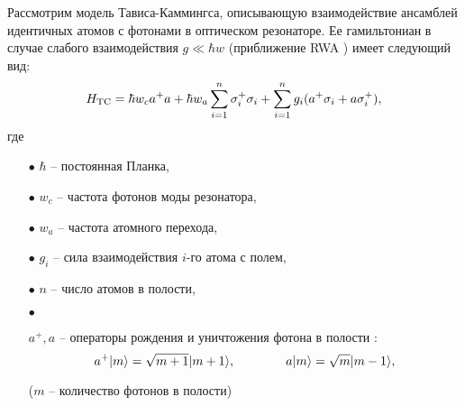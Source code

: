 Рассмотрим модель Тависа-Каммингса, описывающую взаимодействие ансамблей идентичных атомов с фотонами в оптическом резонаторе. Ее гамильтониан в случае слабого
взаимодействия $g \ll \hbar w$ (приближение RWA \cite{ozhigov_qq}) имеет следующий вид:
\begin{equation}
H_{\text{TC}} = \hbar w_{c}a^{+}a + \hbar w_{a} \sum_{i=1}^{n}\sigma_{i}^{+}\sigma_{i} + \sum_{i=1}^{n}g_{i}(a^{+}\sigma_{i} + a\sigma^{+}_{i}),
\end{equation}
где
\begin{itemize}
	\item[$\bullet$]{$\hbar$ -- постоянная Планка,}
	\item[$\bullet$]{$w_{c}$ -- частота фотонов моды резонатора,}
	\item[$\bullet$]{$w_{a}$ -- частота атомного перехода,}
	\item[$\bullet$]{$g_{i}$ -- сила взаимодействия $i$-го атома с полем,}
	\item[$\bullet$]{$n$ --  число атомов в полости,}
	\item[$\bullet$]{$a^{+}, a$ -- операторы рождения и уничтожения фотона в полости \cite{messia}:\\
		\begin{equation}
			a^{+}|m\rangle = \sqrt{m+1}|m+1\rangle,\qquad\qquad a|m\rangle = \sqrt{m}|m-1\rangle,
		\end{equation}
		\begin{center}($m$ -- количество фотонов в полости)\end{center}
		\
		
}
\end{itemize}
